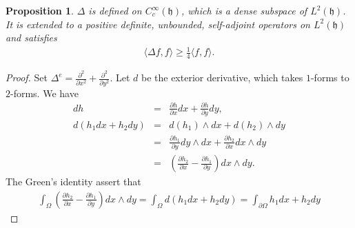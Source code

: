 \documentclass[11pt,reqno]{amsart}
\newcommand{\bna}{\begin{eqnarray*}}
\newcommand{\ena}{\end{eqnarray*}}
\newcommand{\mk}{\mathfrak}
\newtheorem{prop}[lemma]{Proposition}
\theoremstyle{definition}
\begin{document}
\begin{prop}$\Delta$ is defined on $C_c^\infty(\mk h)$,
which is a dense subspace of $L^2(\mk h)$.
It is extended to a positive definite, unbounded, self-adjoint operators on $L^2(\mk h)$
and satisfies
\bna
\langle \Delta f,f\rangle\geq\frac{1}{4}\langle f,f\rangle.
\ena
\end{prop}
\begin{proof}
Set $\Delta^e=\frac{\partial^2}{\partial x^2}+\frac{\partial^2}{\partial y^2}$.
Let $d$ be the exterior derivative, which takes $1$-forms  to $2$-forms.
We have
\bna
dh&=&\frac{\partial h}{\partial x} dx +\frac{\partial h}{\partial y}dy,\\
d\left(h_1dx+h_2dy\right)&=&d(h_1)\wedge dx+ d(h_2)\wedge dy\\
&=&\frac{\partial h_1}{\partial y}dy\wedge dx +\frac{\partial h_2}{\partial x}
dx\wedge dy\\
&=&\left(
\frac{\partial h_2}{\partial x}
-\frac{\partial h_1}{\partial y}
\right) dx\wedge dy.
\ena
The Green's identity assert that
\bna
\int_{\Omega}
\left(\frac{\partial h_2}{\partial x}
-\frac{\partial h_1}{\partial y}
\right) dx\wedge dy=
\int_{\Omega} d\left(h_1dx+h_2dy\right)
=\int_{\partial\Omega}h_1dx+h_2dy
\ena


\end{proof}
\end{document}
